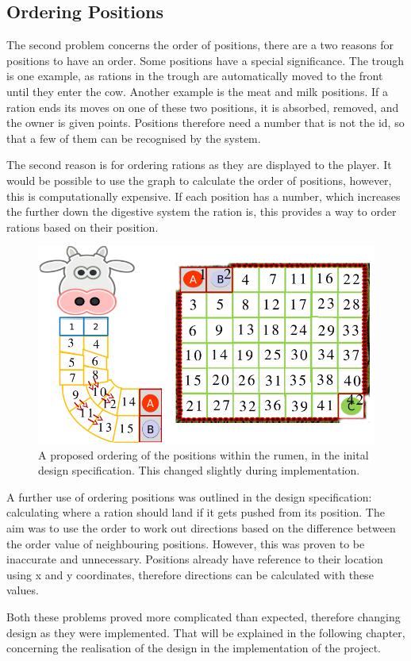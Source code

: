 \subsection{Ordering Positions}
The second problem concerns the order of positions, there are a two reasons for positions to have an order. Some positions have a special significance. The trough is one example, as rations in the trough are automatically moved to the front until they enter the cow. Another example is the meat and milk positions. If a ration ends its moves on one of these two positions, it is absorbed, removed, and the owner is given points. Positions therefore need a number that is not the id, so that a few of them can be recognised by the system.

The second reason is for ordering rations as they are displayed to the player. It would be possible to use the graph to calculate the order of positions, however, this is computationally expensive. If each position has a number, which increases the further down the digestive system the ration is, this provides a way to order rations based on their position.

\begin{figure}[ht]
\centering
\includegraphics[width=6in]{Images/2/detail-3}
\caption{A proposed ordering of the positions within the rumen, in the inital design specification. This changed slightly during implementation.}
\label{2_detail_order}
\end{figure}

A further use of ordering positions was outlined in the design specification: calculating where a ration should land if it gets pushed from its position. The aim was to use the order to work out directions based on the difference between the order value of neighbouring positions. However, this was proven to be inaccurate and unnecessary. Positions already have reference to their location using x and y coordinates, therefore directions can be calculated with these values.

Both these problems proved more complicated than expected, therefore changing design as they were implemented. That will be explained in the following chapter, concerning the realisation of the design in the implementation of the project.